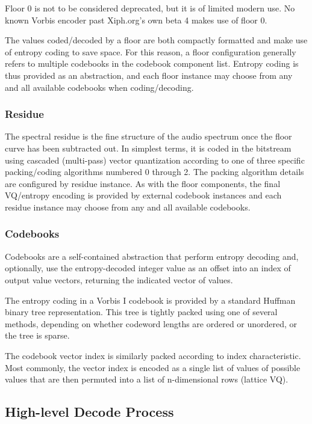 Floor 0 is not to be considered deprecated, but it is of limited
modern use.  No known Vorbis encoder past Xiph.org's own beta 4 makes
use of floor 0.

The values coded/decoded by a floor are both compactly formatted and
make use of entropy coding to save space.  For this reason, a floor
configuration generally refers to multiple codebooks in the codebook
component list.  Entropy coding is thus provided as an abstraction,
and each floor instance may choose from any and all available
codebooks when coding/decoding.


\subsubsection{Residue}
The spectral residue is the fine structure of the audio spectrum
once the floor curve has been subtracted out.  In simplest terms, it
is coded in the bitstream using cascaded (multi-pass) vector
quantization according to one of three specific packing/coding
algorithms numbered 0 through 2.  The packing algorithm details are
configured by residue instance.  As with the floor components, the
final VQ/entropy encoding is provided by external codebook instances
and each residue instance may choose from any and all available
codebooks.

\subsubsection{Codebooks}

Codebooks are a self-contained abstraction that perform entropy
decoding and, optionally, use the entropy-decoded integer value as an
offset into an index of output value vectors, returning the indicated
vector of values.

The entropy coding in a Vorbis I codebook is provided by a standard
Huffman binary tree representation.  This tree is tightly packed using
one of several methods, depending on whether codeword lengths are
ordered or unordered, or the tree is sparse.

The codebook vector index is similarly packed according to index
characteristic.  Most commonly, the vector index is encoded as a
single list of values of possible values that are then permuted into
a list of n-dimensional rows (lattice VQ).



\subsection{High-level Decode Process}

